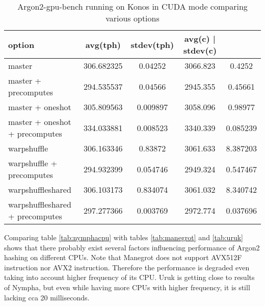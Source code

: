 \documentclass[nolof]{fithesis3}
\begin{document}
\noindent
\begin{table}
\caption{Argon2-gpu-bench running on Konos in CUDA mode comparing various options}
\label{tab:konosgpuopt}
\begin{tabularx}{\textwidth}{| l | c | c | c | c |}
\hline
option & avg(tph) & stdev(tph) & avg(c) | stdev(c)\\
\hline
master & 306.682325 & 0.04252 & 3066.823 & 0.4252 \\
\hline
master + precomputes & 294.535537 & 0.04566 & 2945.355 & 0.45661 \\
\hline
master + oneshot & 305.809563 & 0.009897 & 3058.096 & 0.98977 \\
\hline
master + oneshot + precomputes & 334.033881 & 0.008523 & 3340.339 & 0.085239 \\
\hline
warpshuffle & 306.163346 & 0.83872 & 3061.633 & 8.387203 \\
\hline
warpshuffle + precomputes & 294.932399 & 0.054746 & 2949.324 & 0.547467\\
\hline
warpshuffleshared & 306.103173 & 0.834074 & 3061.032 & 8.340742 \\
\hline
warpshuffleshared + precomputes & 297.277366 & 0.003769 & 2972.774 & 0.037696 \\
\hline
\end{tabularx}
\end{table}

\FloatBarrier

Comparing table \ref{tab:nymphacpu} with tables \ref{tab:manegrot} and \ref{tab:uruk} shows that there probably exist several factors influencing performance of Argon2 hashing on different CPUs. Note that Manegrot does not support AVX512F instruction nor AVX2 instruction. Therefore the performance is degraded even taking into account higher frequency of its CPU. Uruk is getting close to results of Nympha, but even while having more CPUs with higher frequency, it is still lacking cca 20 milliseconds.

\FloatBarrier
\end{document}
